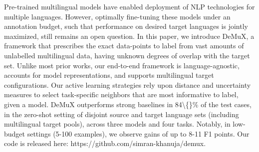 Pre-trained multilingual models have enabled deployment of NLP technologies for multiple languages. However, optimally fine-tuning these models under an annotation budget, such that performance on desired target languages is jointly maximized, still remains an open question. In this paper, we introduce DeMuX, a framework that prescribes the exact data-points to label from vast amounts of unlabelled multilingual data, having unknown degrees of overlap with the target set. Unlike most prior works, our end-to-end framework is language-agnostic, accounts for model representations, and supports multilingual target configurations. Our active learning strategies rely upon distance and uncertainty measures to select task-specific neighbors that are most informative to label, given a model. DeMuX outperforms strong baselines in 84\textbackslash\{\}\% of the test cases, in the zero-shot setting of disjoint source and target language sets (including multilingual target pools), across three models and four tasks. Notably, in low-budget settings (5-100 examples), we observe gains of up to 8-11 F1 points. Our code is released here: https://github.com/simran-khanuja/demux.